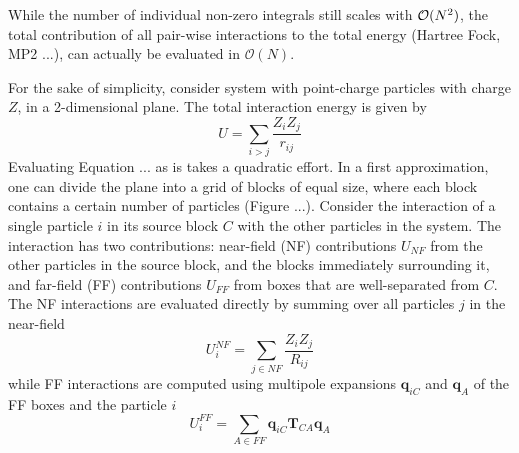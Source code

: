 While the number of individual non-zero integrals still scales with $\mathcal{O}(N^{2})$, the total contribution of all pair-wise interactions to the total energy (Hartree Fock, MP2 ...), can actually be evaluated in $\mathcal{O}(N)$.

For the sake of simplicity, consider system with point-charge particles with charge $Z$, in a 2-dimensional plane. The total interaction energy is given by
\begin{equation}
U = \sum_{i>j} \frac{Z_i Z_j}{r_{ij}}
\end{equation}
\noindent Evaluating Equation ... as is takes a quadratic effort. In a first approximation, one can divide the plane into a grid of blocks of equal size, where each block contains a certain number of particles (Figure ...). Consider the interaction of a single particle $i$ in its source block $C$ with the other particles in the system. The interaction has two contributions: near-field (NF) contributions $U_{NF}$ from the other particles in the source block, and the blocks immediately surrounding it, and far-field (FF) contributions $U_{FF}$ from boxes that are well-separated from $C$. The NF interactions are evaluated directly by summing over all particles $j$ in the near-field
\begin{equation}
U^{NF}_i = \sum_{j \in NF} \frac{Z_i Z_j}{R_{ij}}
\end{equation}
\noindent while FF interactions are computed using multipole expansions $\mathbf{q}_{iC}$ and $\mathbf{q}_A$ of the FF boxes and the particle $i$
\begin{equation}
U^{FF}_i = \sum_{A \in FF} \mathbf{q}_{iC} \mathbf{T}_{CA} \mathbf{q}_A
\end{equation}
